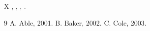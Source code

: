 \documentclass{article}
\begin{document}
X \citep{c,a,b}, \citet{a}, \citep[p.~2]{b}, \cite{a,c}.
\begin{thebibliography}{9}
 A. Able, 2001.
 B. Baker, 2002.
 C. Cole, 2003.
\end{thebibliography}
\end{document}
